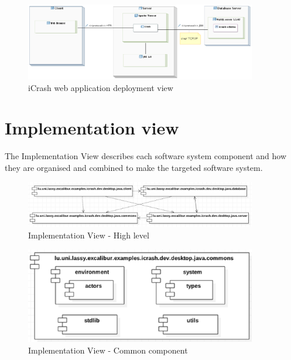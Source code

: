\begin{figure}[H]
\begin{center}
\includegraphics[width=0.9\textwidth]{./images/depl_model_web.eps}
\end{center}
\caption{iCrash web application deployment view}
\end{figure}

\section{Implementation view}
The \gls{Implementation View} describes each software system component and how
they are organised and combined to make the targeted software system.



\begin{figure}[h!]
	\centering
	\includegraphics[width=0.9\textwidth]{./images/impl_highlevel.eps}
	\caption{Implementation View - High level}
\end{figure}

\begin{figure}[h!]
	\centering
	\includegraphics[width=0.9\textwidth]{./images/impl_commons.eps}
	\caption{Implementation View - Common component}
\end{figure}

